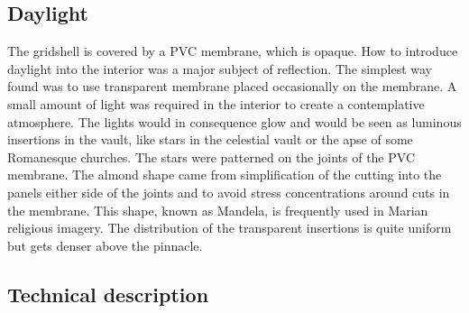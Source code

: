 \subsection{Daylight}
The gridshell is covered by a PVC membrane, which is opaque. How to introduce daylight into the interior was a major subject of reflection. The simplest way found was to use transparent membrane placed occasionally on the membrane. A small amount of light was required in the interior to create a contemplative atmosphere. The lights would in consequence glow and would be seen as luminous insertions in the vault, like stars in the celestial vault or the apse of some Romanesque churches. The stars were patterned on the joints of the PVC membrane. The almond shape came from simplification of the cutting into the panels either side of the joints and to avoid stress concentrations around cuts in the membrane. This shape, known as Mandela, is frequently used in Marian religious imagery. The distribution of the transparent insertions is quite uniform but gets denser above the pinnacle.

\enlargethispage{-4.5cm}

\subsection{Technical description}


